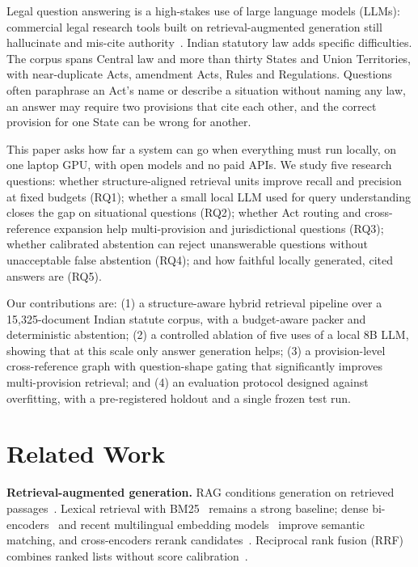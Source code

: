 \documentclass[conference]{IEEEtran}
\begin{document}
Legal question answering is a high-stakes use of large language models (LLMs): commercial legal research tools
built on retrieval-augmented generation still hallucinate and mis-cite authority~\cite{magesh2024hallucination}.
Indian statutory law adds specific difficulties. The corpus spans Central law and more than thirty States and
Union Territories, with near-duplicate Acts, amendment Acts, Rules and Regulations. Questions often paraphrase an
Act's name or describe a situation without naming any law, an answer may require two provisions that cite each
other, and the correct provision for one State can be wrong for another.

This paper asks how far a system can go when everything must run locally, on one laptop GPU, with open models
and no paid APIs. We study five research questions: whether structure-aligned retrieval units improve recall and
precision at fixed budgets (RQ1); whether a small local LLM used for query understanding closes the gap on
situational questions (RQ2); whether Act routing and cross-reference expansion help multi-provision and
jurisdictional questions (RQ3); whether calibrated abstention can reject unanswerable questions without
unacceptable false abstention (RQ4); and how faithful locally generated, cited answers are (RQ5).

Our contributions are: (1) a structure-aware hybrid retrieval pipeline over a 15,325-document Indian statute
corpus, with a budget-aware packer and deterministic abstention; (2) a controlled ablation of five uses of a local
8B LLM, showing that at this scale only answer generation helps; (3) a provision-level cross-reference graph with
question-shape gating that significantly improves multi-provision retrieval; and (4) an evaluation protocol
designed against overfitting, with a pre-registered holdout and a single frozen test run.

\section{Related Work}

\textbf{Retrieval-augmented generation.} RAG conditions generation on retrieved passages~\cite{lewis2020rag}.
Lexical retrieval with BM25~\cite{robertson2009bm25} remains a strong baseline; dense bi-encoders~\cite{karpukhin2020dpr}
and recent multilingual embedding models~\cite{chen2024bgem3,wang2024e5,zhang2025qwen3emb} improve semantic
matching, and cross-encoders rerank candidates~\cite{nogueira2019bert}. Reciprocal rank fusion (RRF) combines
ranked lists without score calibration~\cite{cormack2009rrf}.
\end{document}
